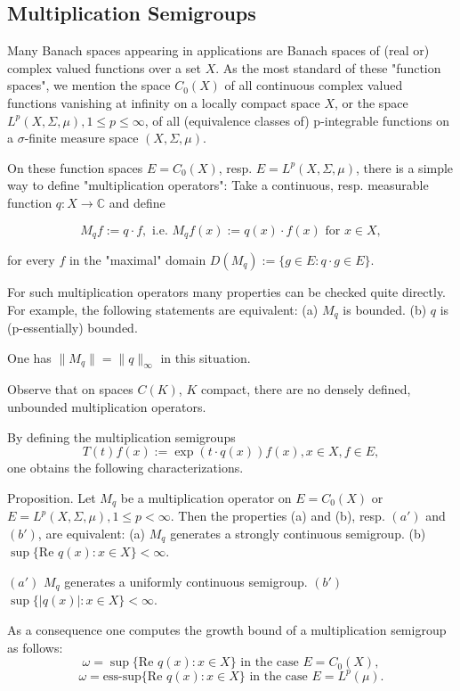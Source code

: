 \documentclass{article}
\begin{document}
\subsection{Multiplication Semigroups}
Many Banach spaces appearing in applications are Banach spaces of (real or) complex valued functions over a set $X$.
As the most standard of these "function spaces", we mention the space $C_0(X)$ of all continuous complex valued functions vanishing at infinity on a locally compact space $X$, or the space $L^p(X,\Sigma,\mu), 1 \leq p \leq \infty$, of all (equivalence classes of) p-integrable functions on a $\sigma$-finite measure space $(X,\Sigma,\mu)$.

On these function spaces $E=C_0(X)$, resp. $E=L^p(X,\Sigma,\mu)$, there is a simple way to define "multiplication operators": Take a continuous, resp. measurable function $q: X \rightarrow \mathbb{C}$ and define

\[
M_qf := q \cdot f, \text{ i.e. } M_qf(x) := q(x) \cdot f(x) \text{ for } x \in X,
\]

for every $f$ in the "maximal" domain $D(M_q) := \{g \in E: q \cdot g \in E\}$.

For such multiplication operators many properties can be checked quite directly.
For example, the following statements are equivalent:
(a) $M_q$ is bounded.
(b) $q$ is (p-essentially) bounded.

One has $\|M_q\| = \|q\|_\infty$ in this situation.

Observe that on spaces $C(K)$, $K$ compact, there are no densely defined, unbounded multiplication operators.

By defining the multiplication semigroups
\[
T(t)f(x) := \exp(t \cdot q(x))f(x), x \in X, f \in E,
\]
one obtains the following characterizations.

Proposition. Let $M_q$ be a multiplication operator on $E=C_0(X)$ or $E=L^p(X,\Sigma,\mu), 1 \leq p < \infty$.
Then the properties (a) and (b), resp. $(a')$ and $(b')$, are equivalent:
(a) $M_q$ generates a strongly continuous semigroup.
(b) $\sup\{\text{Re }q(x): x \in X\} < \infty$.

$(a')$ $M_q$ generates a uniformly continuous semigroup.
$(b')$ $\sup\{|q(x)|: x \in X\} < \infty$.

As a consequence one computes the growth bound of a multiplication semigroup as follows:
\[
\omega = \sup\{\text{Re }q(x): x \in X\} \text{ in the case } E = C_0(X),
\]
\[
\omega = \text{ess-sup}\{\text{Re }q(x): x \in X\} \text{ in the case } E = L^p(\mu).
\]
\end{document}
